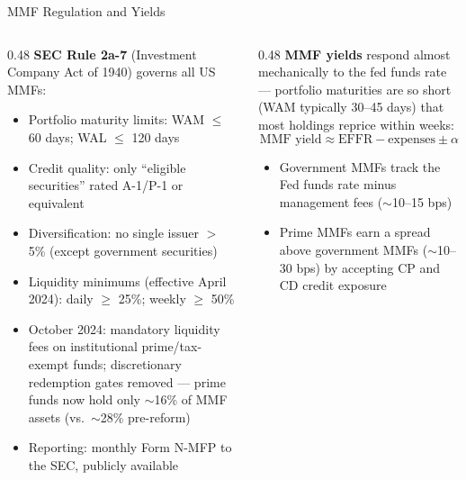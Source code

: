 \documentclass[aspectratio=169]{beamer}
\begin{document}
\begin{frame}{MMF Regulation and Yields}
\begin{columns}
\begin{column}{0.48\textwidth}
\textbf{SEC Rule 2a-7} (Investment Company Act of 1940) governs all US MMFs:
\begin{itemize}\footnotesize
  \item Portfolio maturity limits: WAM $\leq$ 60 days; WAL $\leq$ 120 days
  \item Credit quality: only ``eligible securities'' rated A-1/P-1 or equivalent
  \item Diversification: no single issuer $>$ 5\% (except government securities)
  \item Liquidity minimums (effective April 2024): daily $\geq$ 25\%; weekly $\geq$ 50\%
  \item October 2024: mandatory liquidity fees on institutional prime/tax-exempt funds; discretionary redemption gates removed --- prime funds now hold only $\sim$16\% of MMF assets (vs.\ $\sim$28\% pre-reform)
  \item Reporting: monthly Form N-MFP to the SEC, publicly available
\end{itemize}
\end{column}
\begin{column}{0.48\textwidth}
\textbf{MMF yields} respond almost mechanically to the fed funds rate --- portfolio maturities are so short (WAM typically 30--45 days) that most holdings reprice within weeks:
\[
\text{MMF yield} \approx \text{EFFR} - \text{expenses} \pm \alpha
\]
\begin{itemize}\small
  \item Government MMFs track the Fed funds rate minus management fees ($\sim$10--15 bps)
  \item Prime MMFs earn a spread above government MMFs ($\sim$10--30 bps) by accepting CP and CD credit exposure
\end{itemize}
\end{column}
\end{columns}
\end{frame}
\end{document}
